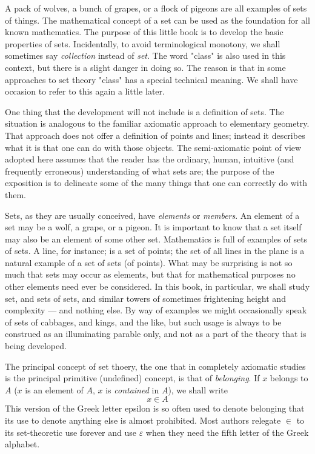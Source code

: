 
A pack of wolves, a bunch of grapes, or a flock of pigeons are all examples of sets of things. The mathematical concept of a set can be used as the foundation for all known mathematics. The purpose of this little book is to develop the basic properties of sets. Incidentally, to avoid terminological monotony, we shall sometimes say \textit{collection} instead of \textit{set}. The word "class" is also used in this context, but there is a slight danger in doing so. The reason is that in some approaches to set theory "class" has a special technical meaning. We shall have occasion to refer to this again a little later.

One thing that the development will not include is a definition of sets. The situation is analogous to the familiar axiomatic approach to elementary geometry. That approach does not offer a definition of points and lines; instead it describes what it is that one can do with those objects. The semi-axiomatic point of view adopted here assumes that the reader has the ordinary, human, intuitive (and frequently erroneous) understanding of what sets are; the purpose of the exposition is to delineate some of the many things that one can correctly do with them.

Sets, as they are usually conceived, have \textit{elements} or \textit{members}. An element of a set may be a wolf, a grape, or a pigeon. It is important to know that a set itself may also be an element of some other set. Mathematics is full of examples of sets of sets. A line, for instance; is a set of points; the set of all lines in the plane is a natural example of a set of sets (of points). What may be surprising is not so much that sets may occur as elements, but that for mathematical purposes no other elements need ever be considered. In this book, in particular, we shall study set, and sets of sets, and similar towers of sometimes frightening height and complexity — and nothing else. By way of examples we might occasionally speak of sets of cabbages, and kings, and the like, but such usage is always to be construed as an illuminating parable only, and not as a part of the theory that is being developed. 

The principal concept of set thoery, the one that in completely axiomatic studies is the principal primitive (undefined) concept, is that of \textit{belonging}. If $x$ belongs to $A$ ($x$ is an element of $A$, $x$ is \textit{contained} in $A$), we shall write 
\begin{equation*}
x \in A
\end{equation*}
This version of the Greek letter epsilon is so often used to denote belonging that its use to denote anything else is almost prohibited. Most authors relegate $\in$ to its set-theoretic use forever and use $\varepsilon$ when they need the fifth letter of the Greek alphabet. 

